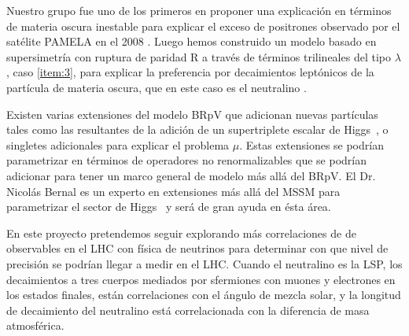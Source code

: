 \begin{gravitinodm}
Nuestro grupo \cite{Nardi:2008ix} fue uno de los
primeros en proponer una explicación en términos de materia oscura
inestable para explicar el exceso de positrones observado por el
satélite PAMELA en el 2008 \cite{Adriani:2008zr}. Luego hemos
construido un modelo basado en supersimetría con ruptura de paridad R
a través de términos trilineales del tipo $\lambda$, caso
\ref{item:3}, para explicar la preferencia por decaimientos leptónicos
de la partícula de materia oscura, que en este caso es el
neutralino \cite{Sierra:2009zq}.
\end{gravitinodm}

\begin{bbrpvlhc}
  Existen varias extensiones del modelo BRpV que adicionan nuevas
  partículas tales como las resultantes de la adición de un
  supertriplete escalar de Higgs~\cite{}, o singletes adicionales para
  explicar el problema $\mu$. Estas extensiones se podrían
  parametrizar en términos de operadores no renormalizables que se
  podrían adicionar para tener un marco general de modelo más allá del
  BRpV. El Dr. Nicolás Bernal es un experto en extensiones más allá
  del MSSM para parametrizar el sector de Higgs~\cite{} y será de gran
  ayuda en ésta área.
\end{bbrpvlhc}

\begin{brpvlhc}
  En este proyecto pretendemos seguir explorando más correlaciones de
  de observables en el LHC con física de neutrinos para determinar con
  que nivel de precisión se podrían llegar a medir en el LHC. Cuando
  el neutralino es la LSP, los decaimientos a tres cuerpos mediados
  por sfermiones con muones y electrones en los estados finales, están
  correlaciones con el ángulo de mezcla solar, y la longitud de
  decaimiento del neutralino está correlacionada con la diferencia de
  masa atmosférica.
\end{brpvlhc}


